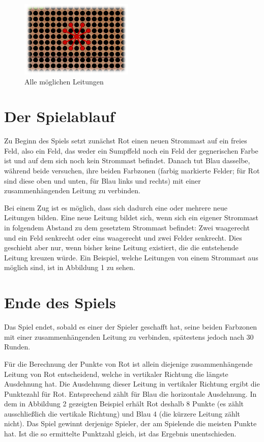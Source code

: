 \documentclass[a4paper, ngerman]{scrartcl}
\begin{document}
\begin{figure}
  \centering
  \includegraphics[width=0.48\textwidth]{bilder/setzzug.png}
  \caption{Alle möglichen Leitungen}\label{fig:Leitungen}
\end{figure}

\section{Der Spielablauf}
Zu Beginn des Spiels setzt zunächst Rot einen neuen Strommast auf ein
freies Feld, also ein Feld, das weder ein Sumpffeld noch ein Feld der
gegnerischen Farbe ist und auf dem sich noch kein Strommast befindet.
Danach tut Blau dasselbe, während beide versuchen,
ihre beiden Farbzonen (farbig markierte Felder; für Rot sind diese oben und
unten, für Blau  links und rechts) mit einer zusammenhängenden Leitung zu
verbinden.

Bei einem Zug ist es möglich, dass sich dadurch eine oder mehrere
neue Leitungen bilden. Eine neue Leitung bildet sich, wenn sich ein eigener
Strommast in folgendem Abstand zu dem gesetztem Strommast befindet: Zwei
waagerecht und ein Feld senkrecht oder eins waagerecht und zwei Felder
senkrecht. Dies geschieht aber nur, wenn bisher keine Leitung existiert, die
die entstehende Leitung kreuzen würde.
Ein Beispiel, welche Leitungen von einem Strommast aus möglich sind, ist
in Abbildung 1 zu sehen.


\section{Ende des Spiels}
Das Spiel endet, sobald es einer der Spieler geschafft hat, seine beiden
Farbzonen mit einer zusammenhängenden Leitung zu verbinden, spätestens jedoch
nach 30 Runden.

Für die Berechnung der Punkte von Rot ist allein diejenige zusammenhängende
Leitung von Rot entscheidend, welche in vertikaler Richtung die längste
Ausdehnung hat. Die Ausdehnung dieser Leitung in vertikaler Richtung ergibt
die Punktezahl für Rot. Entsprechend zählt für Blau die horizontale Ausdehnung.
In dem in Abbildung 2 gezeigten Beispiel erhält Rot deshalb 8 Punkte (es zählt ausschließlich
die vertikale Richtung)
und Blau 4 (die kürzere Leitung zählt nicht). Das Spiel gewinnt derjenige Spieler, der am Spielende
die meisten Punkte hat.
Ist die so ermittelte Punktzahl gleich, ist das Ergebnis unentschieden.
\end{document}
